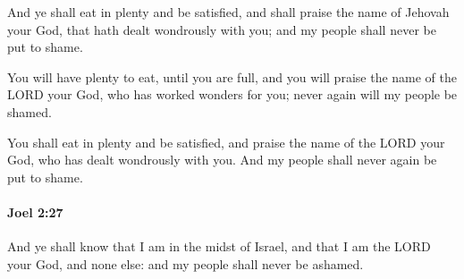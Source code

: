 			\begin{versebox}
					\item[BHS] 
					\item[LXX] 
					\item[ASV] And ye shall eat in plenty and be satisfied, and shall praise the name of Jehovah your God, that hath dealt wondrously with you; and my people shall never be put to shame.
					\item[NIV] You will have plenty to eat, until you are full, and you will praise the name of the LORD your God, who has worked wonders for you; never again will my people be shamed.
					\item[NRSV] You shall eat in plenty and be satisfied, and praise the name of the LORD your God, who has dealt wondrously with you. And my people shall never again be put to shame.
			\end{versebox}

		\paragraph{Joel 2:27} %
			\label{JOEL-2-27}

			And ye shall know that I am in the midst of Israel, and that I am the LORD your God, and none else: and my people shall never be ashamed.

